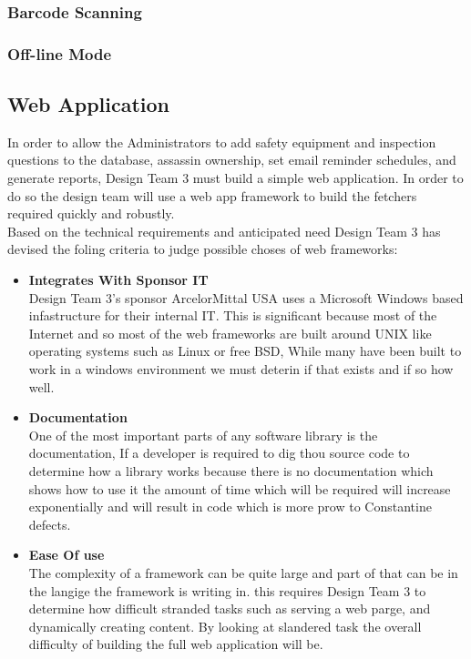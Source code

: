 \documentclass[Letter,11pt]{article}
\begin{document}
	\subsubsection{Barcode Scanning}
	
	\subsubsection{Off-line Mode}
	
	\subsection{Web Application}
		In order to allow the Administrators to add safety equipment and inspection questions to the database, assassin ownership, set email reminder schedules, and generate reports, Design Team 3 must build a simple web application. In order to do so the design team will use a web app framework to build the fetchers required quickly and robustly.
		\\
		Based on the technical requirements and anticipated need Design Team 3 has devised the foling criteria to judge possible choses of web frameworks: 
		\\
		\begin{minipage}[t]{0.5\textwidth}
		\begin{itemize}
			\item \textbf{Integrates With Sponsor IT}\\
			Design Team 3's sponsor ArcelorMittal USA uses a Microsoft Windows based infastructure for their internal IT. This is significant because  most of the Internet and so most of the web frameworks are built around UNIX like operating systems such as Linux or free BSD, While many have been built to work in a windows environment we must deterin if that exists and if so how well.
			
			\item \textbf{Documentation}\\
			One of the most important parts of any software library is the documentation, If a developer is required to dig thou source code to determine how a library works because there is no documentation which shows how to use it the amount of time which will be required will increase exponentially and will result in code which is more prow to Constantine defects.
				
			\item \textbf{Ease Of use} \\
			The complexity of a framework can be quite large and part of that can be in the langige the framework is writing in. this requires Design Team 3 to determine how difficult stranded tasks such as serving a web parge, and dynamically creating content. By looking at slandered task the overall difficulty of building the full web application will be.	
		\end{itemize}
		\end{minipage}
\end{document}
